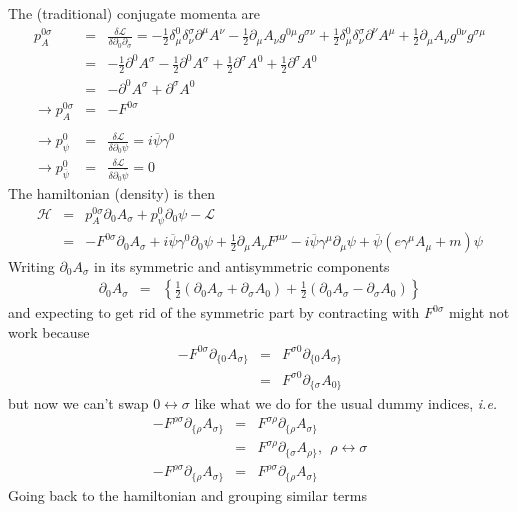 \documentclass[aps,preprint,preprintnumbers,nofootinbib,showpacs,prd]{revtex4-1}
\newcommand{\ie}{{\it i.e.} }
\newcommand{\nbea}{\begin{eqnarray*}}
\newcommand{\neea}{\end{eqnarray*}}
\begin{document}
The (traditional) conjugate momenta are
%
\nbea
p_A^{0\sigma} & = & \frac{\delta \mathcal{L}}{\delta \partial_0 \partial_\sigma} = -\frac{1}{2} \delta^0_\mu \delta^\sigma_\nu \partial^\mu A^\nu - \frac{1}{2} \partial_\mu A_\nu g^{0\mu} g^{\sigma\nu} + \frac{1}{2} \delta^0_\mu \delta^\sigma_\nu \partial^\nu A^\mu + \frac{1}{2} \partial_\mu A_\nu g^{0\nu} g^{\sigma\mu} \\
& = &  - \frac{1}{2} \partial^0 A^\sigma - \frac{1}{2} \partial^0 A^\sigma + \frac{1}{2} \partial^\sigma A^0 + \frac{1}{2} \partial^\sigma A^0 \\
& = & - \partial^0 A^\sigma + \partial^\sigma A^0 \\
\rightarrow p_A^{0\sigma} & = & - F^{0\sigma} \\ \\
\rightarrow p_\psi^{0} & = & \frac{\delta \mathcal{L}}{\delta \partial_0 \psi} = i \overline \psi \gamma^0 \\
\rightarrow p_{\overline \psi}^{0} & = & \frac{\delta \mathcal{L}}{\delta \partial_0 {\overline \psi}} = 0
\neea
%
The hamiltonian (density) is then
%
\nbea
\mathcal{H} & = & p_A^{0\sigma}\partial_0 A_\sigma + p_\psi^{0} \partial_0 \psi - \mathcal{L} \\
& = & - F^{0\sigma} \partial_0 A_\sigma +  i \overline \psi \gamma^0 \partial_0 \psi + \frac{1}{2} \partial_\mu A_\nu F^{\mu\nu}  - i \overline \psi \gamma^\mu \partial_\mu \psi + \overline \psi \left ( e \gamma^\mu A_\mu + m\right ) \psi
\neea
%
Writing $\partial_0 A_\sigma$ in its symmetric and antisymmetric components
%
\nbea
\partial_0 A_\sigma & = & \left \{ \frac{1}{2} (\partial_0 A_\sigma + \partial_\sigma A_0) + \frac{1}{2} (\partial_0 A_\sigma - \partial_\sigma A_0)\right \}
\neea
%
and expecting to get rid of the symmetric part by contracting with $F^{0\sigma}$ might not work because
%
\nbea
- F^{0\sigma} \partial_{\{0} A_{\sigma\}} & = & F^{\sigma 0} \partial_{\{0} A_{\sigma\}} \\
& = & F^{\sigma 0} \partial_{\{\sigma} A_{0\}}
\neea
%
but now we can't swap $0 \leftrightarrow \sigma$ like what we do for the usual dummy indices, \ie 
%
\nbea
- F^{\rho\sigma} \partial_{\{\rho} A_{\sigma\}} & = & F^{\sigma \rho} \partial_{\{\rho} A_{\sigma\}} \\
& = & F^{\sigma \rho} \partial_{\{\sigma} A_{\rho\}}, ~~ \rho \leftrightarrow \sigma\\
- F^{\rho\sigma} \partial_{\{\rho} A_{\sigma\}} & = & F^{\rho\sigma} \partial_{\{\rho} A_{\sigma\}}
\neea
%
Going back to the hamiltonian and grouping similar terms
\end{document}
